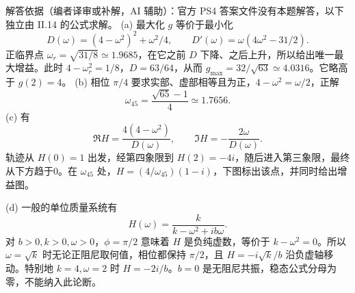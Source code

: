 \begin{solution}
解答依据（编者译审或补解，AI 辅助）：官方 PS4 答案文件没有本题解答，以下独立由 II.14 的公式求解。
(a) 最大化 $g$ 等价于最小化
\[
 D(\omega)=(4-\omega^2)^2+\omega^2/4,\qquad
 D'(\omega)=\omega(4\omega^2-31/2).
\]
正临界点 $\omega_r=\sqrt{31/8}\simeq1.9685$，在它之前 $D$ 下降、之后上升，所以给出唯一最大增益。此时 $4-\omega_r^2=1/8$，$D=63/64$，从而 $g_{\max}=32/\sqrt{63}\simeq4.0316$。它略高于 $g(2)=4$。
(b) 相位 $\pi/4$ 要求实部、虚部相等且为正，$4-\omega^2=\omega/2$，正解
\[
 \omega_{45}=\frac{\sqrt{65}-1}{4}\simeq1.7656.
\]
(c) 有
\[
 \Re H=\frac{4(4-\omega^2)}{D(\omega)},\qquad
 \Im H=-\frac{2\omega}{D(\omega)}.
\]
轨迹从 $H(0)=1$ 出发，经第四象限到 $H(2)=-4i$，随后进入第三象限，最终从下方趋于0。在 $\omega_{45}$ 处，$H=(4/\omega_{45})(1-i)$，下图标出该点，并同时给出增益图。
\begin{center}\end{center}
(d) 一般的单位质量系统有
\[
 H(\omega)=\frac{k}{k-\omega^2+ib\omega}.
\]
对 $b>0,k>0,\omega>0$，$\phi=\pi/2$ 意味着 $H$ 是负纯虚数，等价于 $k-\omega^2=0$。所以 $\omega=\sqrt k$ 时无论正阻尼取何值，相位都保持 $\pi/2$，且 $H=-i\sqrt k/b$ 沿负虚轴移动。特别地 $k=4,\omega=2$ 时 $H=-2i/b$。$b=0$ 是无阻尼共振，稳态公式分母为零，不能纳入此论断。
\end{solution}

